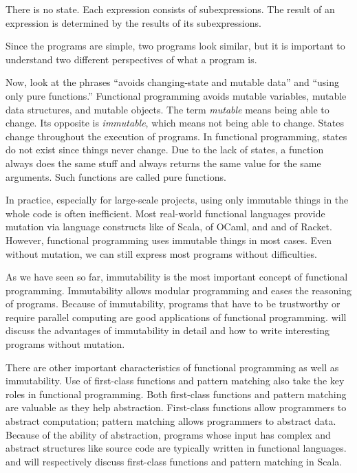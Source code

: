 There is no state. Each expression consists of subexpressions. The result of
an expression is determined by the results of its subexpressions.

Since the programs are simple, two programs look similar, but it is important to
understand two different perspectives of what a program is.

Now, look at the phrases ``avoids changing-state and mutable data'' and ``using
only pure functions.'' Functional programming avoids mutable variables, mutable data
structures, and mutable objects. The term \textit{mutable}
means being able to change. Its opposite is \textit{immutable},
which means not being able to change. States change throughout the execution of programs.
In functional programming, states do not exist since things never change.
Due to the lack of states, a function always does the same stuff
and always returns the same value for the same arguments. Such functions
are called pure functions.

In practice, especially for large-scale projects, using only immutable things in
the whole code is often inefficient. Most real-world functional languages
provide mutation via language constructs like  of Scala,  of
OCaml, and  and  of Racket. However,
functional programming uses immutable things in most cases. Even without
mutation, we can still express most programs without difficulties.

As we have seen so far,
immutability is the most important concept of functional programming.
Immutability allows modular programming and eases the reasoning of programs.
Because of immutability, programs that have to be trustworthy or require parallel computing
are good applications of functional programming.
 will discuss the advantages of immutability in detail and
how to write interesting programs without mutation.

There are other important characteristics of functional programming as well as
immutability. Use of first-class functions and pattern matching also take the
key roles in functional programming. Both first-class functions and pattern matching
are valuable as they help abstraction. First-class functions allow programmers
to abstract computation; pattern matching allows programmers to abstract
data. Because of the ability of abstraction,
programs whose input has complex and abstract structures like source code
are typically written in functional languages.
 and  will respectively discuss first-class
functions and pattern matching in Scala.

